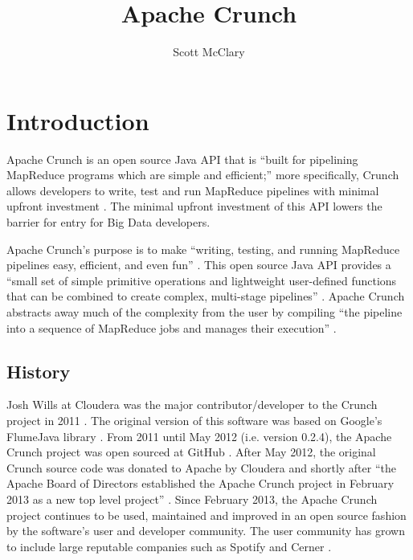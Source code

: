 \documentclass[9pt,twocolumn,twoside]{../../styles/osajnl}
\title{Apache Crunch}
\author[1,*]{Scott McClary}
\affil[1]{School of Informatics and Computing, Bloomington, IN 47408, U.S.A.}
\affil[*]{Corresponding authors: scmcclar@indiana.edu}
\begin{document}
\maketitle

\section{Introduction} \label{introduction} 
Apache Crunch is an open source Java API that is ``built for
pipelining MapReduce programs which are simple and efficient;'' more
specifically, Crunch allows developers to write, test and run
MapReduce pipelines with minimal upfront investment
\cite{www-hadoop-ecosystem, www-mapreduce}. The minimal upfront
investment of this API lowers the barrier for entry for Big Data
developers.

Apache Crunch's purpose is to make ``writing, testing, and running
MapReduce pipelines easy, efficient, and even fun''
\cite{www-wills-crunch, www-mapreduce}. This open source Java API
provides a ``small set of simple primitive operations and lightweight
user-defined functions that can be combined to create complex,
multi-stage pipelines'' \cite{www-wills-crunch}. Apache Crunch
abstracts away much of the complexity from the user by compiling ``the
pipeline into a sequence of MapReduce jobs and manages their
execution'' \cite{www-wills-crunch, www-mapreduce}.

\subsection{History} \label{about}
Josh Wills at Cloudera was the major contributor/developer to the
Crunch project in 2011 \cite{www-crunch-about,
  www-wills-cloudera}. The original version of this software was based
on Google's FlumeJava library \cite{FlumeJava-paper-2012,
  www-crunch-about, www-wills-cloudera}. From 2011 until May 2012
(i.e. version 0.2.4), the Apache Crunch project was open sourced at
GitHub \cite{www-crunch-about, www-github}. After May 2012, the
original Crunch source code was donated to Apache by Cloudera and
shortly after ``the Apache Board of Directors established the Apache
Crunch project in February 2013 as a new top level project''
\cite{www-crunch-about}. Since February 2013, the Apache Crunch
project continues to be used, maintained and improved in an open
source fashion by the software's user and developer community. The
user community has grown to include large reputable companies such as
Spotify and Cerner \cite{www-crunch-spotify, www-crunch-cerner}.
\end{document}
